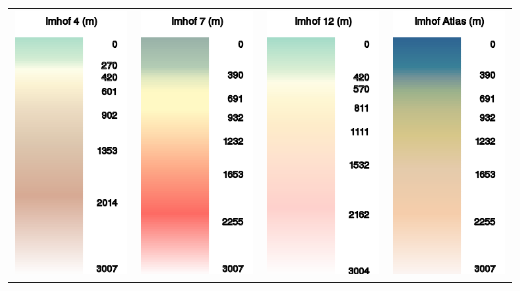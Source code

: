 \begin{longtable}{c c c c}
\includegraphics[angle=0,width=3.0cm,keepaspectratio='true']{figures/ramp-terrain-imhof4.png}&
\includegraphics[angle=0,width=3.0cm,keepaspectratio='true']{figures/ramp-terrain-imhof7.png}&
\includegraphics[angle=0,width=3.0cm,keepaspectratio='true']{figures/ramp-terrain-imhof12.png}&
\includegraphics[angle=0,width=3.0cm,keepaspectratio='true']{figures/ramp-terrain-imhofatlas.png}
\end{longtable}
